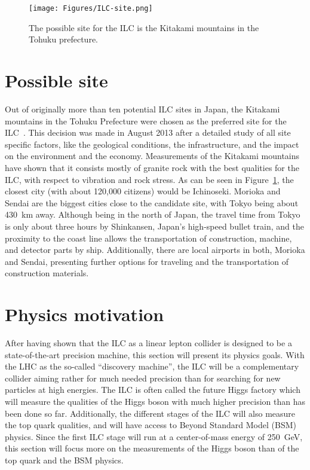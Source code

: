 \label{ILC:site}
\begin{figure}[h]
\centering
\texttt{[image: Figures/ILC-site.png]}
\caption[Possible site for the ILC]{The possible site for the ILC is the Kitakami mountains in the Tohuku prefecture.\cite{Kitakami}}
\label{fig:ILC_Site}
\end{figure}
\section{Possible site}
Out of originally more than ten potential ILC sites in Japan, the Kitakami mountains in the Tohuku Prefecture were chosen as the preferred site for the ILC~\cite{Site}.
This decision was made in August 2013 after a detailed study of all site specific factors, like the geological conditions, the infrastructure, and the impact on the environment and the economy.
Measurements of the Kitakami mountains have shown that it consists mostly of granite rock with the best qualities for the ILC, with respect to vibration and rock stress.
As can be seen in Figure~\ref{fig:ILC_Site}, the closest city (with about 120,000 citizens) would be Ichinoseki.
Morioka and Sendai are the biggest cities close to the candidate site, with Tokyo being about \SI{430}{\kilo\meter} away.
Although being in the north of Japan, the travel time from Tokyo is only about three hours by Shinkansen, Japan's high-speed bullet train, and the proximity to the coast line allows the transportation of construction, machine, and detector parts by ship.
Additionally, there are local airports in both, Morioka and Sendai, presenting further options for traveling and the transportation of construction materials.

\section{Physics motivation}
\label{ILC:physicsmotivation}
After having shown that the ILC as a linear lepton collider is designed to be a state-of-the-art precision machine, this section will present its physics goals.
With the LHC as the so-called ``discovery machine'', the ILC will be a complementary collider aiming rather for much needed precision than for searching for new particles at high energies.
The ILC is often called the future Higgs factory which will measure the qualities of the Higgs boson with much higher precision than has been done so far.
Additionally, the different stages of the ILC will also measure the top quark qualities, and will have access to Beyond Standard Model (BSM) physics.
Since the first ILC stage will run at a center-of-mass energy of \SI{250}{\GeV}, this section will focus more on the measurements of the Higgs boson than of the top quark and the BSM physics.
 

